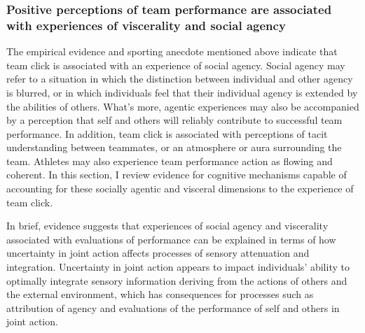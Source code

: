 \begin{CJK}{UTF8}{gbsn}


\subsubsection{Positive perceptions of team performance are associated with experiences of viscerality and social agency}


The empirical evidence and sporting anecdote mentioned above indicate that team click is associated with an experience of social agency. Social agency may refer to a situation in which the distinction between individual and other agency is blurred, or in which individuals feel that their individual agency is extended by the abilities of others.  What's more, agentic experiences may also be accompanied by a perception that self and others will reliably contribute to successful team performance.  In addition, team click is associated with perceptions of tacit understanding between teammates, or an atmosphere or aura surrounding the team.  Athletes may also experience team performance action as flowing and coherent. In this section, I review evidence for cognitive mechanisms capable of accounting for these socially agentic and visceral dimensions to the experience of team click.

In brief, evidence suggests that experiences of social agency and viscerality associated with evaluations of performance can be explained in terms of how uncertainty in joint action affects processes of sensory attenuation and integration.  Uncertainty in joint action appears to impact individuals' ability to optimally integrate sensory information deriving from the actions of others and the external environment, which has consequences for processes such as attribution of agency and evaluations of the performance of self and others in joint action.


\end{CJK}
